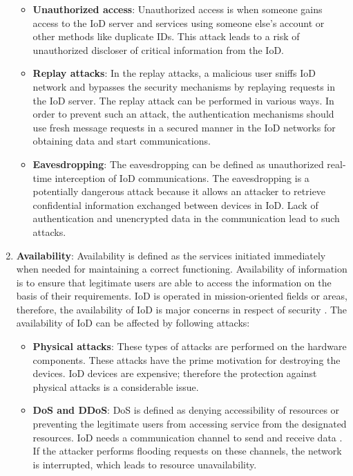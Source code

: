 \documentclass{easychair}
\begin{document}
\begin{enumerate}
\begin{itemize}
\item \textbf{Unauthorized access}: Unauthorized access is when someone gains access to the IoD server and services using someone else's account or other methods like duplicate IDs. This attack leads to a risk of unauthorized discloser of critical information from the IoD.

\item \textbf{Replay attacks}: In the replay attacks, a malicious user sniffs IoD network and bypasses the security mechanisms by replaying requests in the IoD server. The replay attack can be performed in various ways. In order to prevent such an attack, the authentication mechanisms should use fresh message requests in a secured manner in the IoD networks for obtaining data and start communications.

\item \textbf{Eavesdropping}: The eavesdropping can be defined as unauthorized real-time interception of IoD communications. The eavesdropping is a potentially dangerous attack because it allows an attacker to retrieve confidential information exchanged between devices in IoD.  Lack of authentication and unencrypted data in the communication lead to such attacks.
\end{itemize}

 \item
  \textbf{Availability}:  Availability is defined as the services initiated immediately when needed for maintaining a correct functioning. Availability of information is to ensure that legitimate users are able to access the information on the basis of their requirements. IoD is operated in mission-oriented fields or areas, therefore, the availability of IoD is major concerns in respect of security \cite{yampolskiy2013taxonomy}. The availability of IoD can be affected by following attacks:
  \begin{itemize}
  \item \textbf{Physical attacks}: These types of attacks are performed on the hardware components. These attacks have the prime motivation for destroying the devices. IoD devices are expensive; therefore the protection against physical attacks is a considerable issue.

  \item \textbf{DoS and DDoS}:
DoS is defined as denying accessibility of resources or preventing the legitimate users from accessing service from the designated resources. IoD needs a communication channel to send and receive data \cite{rodday2016exploring}. If the attacker performs flooding requests on these channels, the network is interrupted, which leads to resource unavailability.


\end{itemize}
\end{enumerate}
\end{document}
